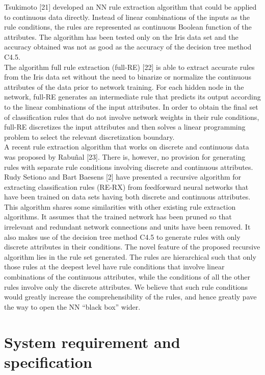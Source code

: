 \documentclass[a4paper,14pt,onecolumn]{article}
\begin{document}
    Tsukimoto [21] developed an NN rule extraction algorithm that could be applied to continuous data directly. Instead of linear combinations of the inputs as the rule conditions, the rules are represented as continuous Boolean function of the attributes. The algorithm has been tested only on the Iris data set and the accuracy obtained was not as good as the accuracy of the decision tree method C4.5.\\
    The algorithm full rule extraction (full-RE) [22] is able to extract accurate rules from the Iris data set without the need to binarize or normalize the continuous attributes of the data prior to network training. For each hidden node in the network, full-RE generates an intermediate rule that predicts its output according to the linear combinations of the input attributes. In order to obtain the final set of classification rules that do not involve network weights in their rule conditions, full-RE discretizes the input attributes and then solves a linear programming problem to select the relevant discretization boundary.\\
    A recent rule extraction algorithm that works on discrete and continuous data was proposed by Rabuñal [23]. There is, however, no provision for generating rules with separate rule conditions involving discrete and continuous attributes.\\
     Rudy Setiono and Bart Baesens [2] have presented a recursive algorithm for extracting classification rules (RE-RX) from feedforward neural networks that have been trained on data sets having both discrete and continuous attributes. This algorithm shares some similarities with other existing rule extraction algorithms. It assumes that the trained network has been pruned so that irrelevant and redundant network connections and units have been removed. It also makes use of the decision tree method C4.5 to generate rules with only discrete attributes in their conditions. The novel feature of the proposed recursive algorithm lies in the rule set generated. The rules are hierarchical such that only those rules at the deepest level have rule conditions that involve linear combinations of the continuous attributes, while the conditions of all the other rules involve only the discrete attributes. We believe that such rule conditions would greatly increase the comprehensibility of the rules, and hence greatly pave the way to open the NN “black box” wider.\\

\newpage
\section{System requirement and specification }
\end{document}
